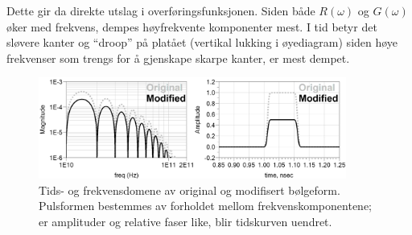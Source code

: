 \noindent Dette gir da direkte utslag i overføringsfunksjonen. Siden både \(R(\omega)\) og \(G(\omega)\) øker med frekvens, dempes høyfrekvente komponenter mest.
I tid betyr det sløvere kanter og “droop” på platået (vertikal lukking i øyediagram) siden høye frekvenser som trengs for å gjenskape skarpe kanter, er mest dempet.
\begin{figure}[h]
    \centering
    \includegraphics[width=0.9\textwidth]{Media/frekvensdoment_tidsdoment.png}
    \caption{Tids- og frekvensdomene av original og modifisert bølgeform. Pulsformen bestemmes av forholdet mellom frekvenskomponentene; er amplituder og relative faser like, blir tidskurven uendret.}
    \label{fig:eyediagram}
\end{figure}
